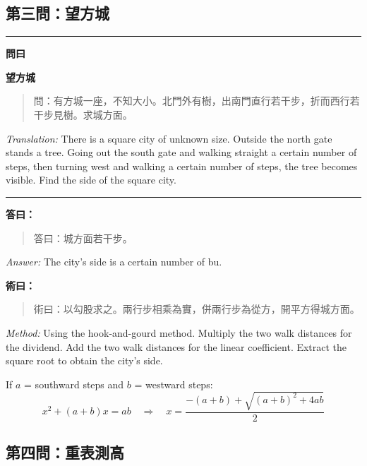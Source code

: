 \documentclass[11pt,a4paper]{article}
\newenvironment{problem}[1][]{%
  \medskip\noindent\rule{\textwidth}{0.4pt}%
  \par\noindent\textbf{\color{sectioncolor}#1}\par\nopagebreak%
  \smallskip%
}{%
  \par\noindent\rule{\textwidth}{0.4pt}\medskip%
}
\newenvironment{answer}{%
  \medskip\noindent{\color{answercolor}\rule{0.5\textwidth}{0.5pt}}%
  \par\color{answercolor}%
}{%
  \par\medskip%
}
\newenvironment{method}{%
  \medskip\noindent{\color{methodcolor}\rule{0.5\textwidth}{0.5pt}}%
  \par\color{methodcolor}%
}{%
  \par\medskip%
}
\begin{document}
\subsection*{第三問：望方城}

\begin{problem}[\textbf{問曰}]
\textbf{\color{sectioncolor}望方城}

\begin{quote}
\textcolor{chinacolor}{%
問：有方城一座，不知大小。北門外有樹，出南門直行若干步，折而西行若干步見樹。求城方面。
}
\end{quote}

\textit{Translation:} There is a square city of unknown size. Outside the 
north gate stands a tree. Going out the south gate and walking straight 
a certain number of steps, then turning west and walking a certain 
number of steps, the tree becomes visible. Find the side of the square 
city.
\end{problem}

\begin{answer}
\textbf{答曰：}

\begin{quote}
\textcolor{chinacolor}{%
答曰：城方面若干步。
}
\end{quote}

\textit{Answer:} The city's side is a certain number of bu.
\end{answer}

\begin{method}
\textbf{術曰：}

\begin{quote}
\textcolor{chinacolor}{%
術曰：以勾股求之。兩行步相乘為實，併兩行步為從方，開平方得城方面。
}
\end{quote}

\textit{Method:} Using the hook-and-gourd method. Multiply the two walk 
distances for the dividend. Add the two walk distances for the linear 
coefficient. Extract the square root to obtain the city's side.

\medskip
If $a$ = southward steps and $b$ = westward steps:
\[
x^2 + (a+b)x = ab \quad\Rightarrow\quad x = \frac{-(a+b) + \sqrt{(a+b)^2 + 4ab}}{2}
\]
\end{method}

\subsection*{第四問：重表測高}
\end{document}
